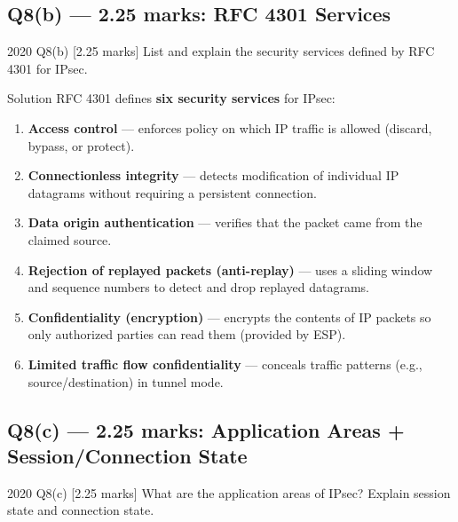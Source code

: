 \documentclass[12pt,a4paper]{article}
\begin{document}
\vspace{1em}

\subsection{Q8(b) --- 2.25 marks: RFC 4301 Services}

\begin{qbox}{2020 Q8(b) [2.25 marks]}
  List and explain the security services defined by RFC 4301 for IPsec.
\end{qbox}

\begin{solbox}{Solution}
RFC 4301 defines \textbf{six security services} for IPsec:
\begin{enumerate}[nosep]
  \item \textbf{Access control} --- enforces policy on which IP traffic is allowed (discard, bypass, or protect).
  \item \textbf{Connectionless integrity} --- detects modification of individual IP datagrams without requiring a persistent connection.
  \item \textbf{Data origin authentication} --- verifies that the packet came from the claimed source.
  \item \textbf{Rejection of replayed packets (anti-replay)} --- uses a sliding window and sequence numbers to detect and drop replayed datagrams.
  \item \textbf{Confidentiality (encryption)} --- encrypts the contents of IP packets so only authorized parties can read them (provided by ESP).
  \item \textbf{Limited traffic flow confidentiality} --- conceals traffic patterns (e.g., source/destination) in tunnel mode.
\end{enumerate}
\end{solbox}

\vspace{1em}

\subsection{Q8(c) --- 2.25 marks: Application Areas + Session/Connection State}

\begin{qbox}{2020 Q8(c) [2.25 marks]}
  What are the application areas of IPsec? Explain session state and connection state.
\end{qbox}
\end{document}
